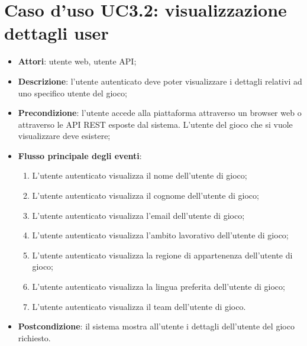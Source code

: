 \section{Caso d'uso UC3.2: visualizzazione dettagli user}
\begin{itemize}
\item \textbf{Attori}: utente web, utente API;
\item \textbf{Descrizione}: l'utente autenticato deve poter visualizzare i dettagli relativi ad uno specifico utente del gioco; 
      \item \textbf{Precondizione}: l'utente accede alla piattaforma attraverso un browser web o attraverso le API REST esposte dal sistema. L'utente del gioco che si vuole visualizzare deve esistere;

        \item \textbf{Flusso principale degli eventi}:
          \begin{enumerate}
          \item L'utente autenticato visualizza il nome dell'utente di gioco;
          \item L'utente autenticato visualizza il cognome dell'utente di gioco;
          \item L'utente autenticato visualizza l'email dell'utente di gioco;
          \item L'utente autenticato visualizza l'ambito lavorativo dell'utente di gioco;
          \item L'utente autenticato visualizza la regione di appartenenza dell'utente di gioco;
          \item L'utente autenticato visualizza la lingua preferita dell'utente di gioco;
          \item L'utente autenticato visualizza il team dell'utente di gioco.

      \end{enumerate}
    \item \textbf{Postcondizione}: il sistema mostra all'utente i dettagli dell'utente del gioco richiesto.
  \end{itemize}
\hypertarget{UC3.3}{}
